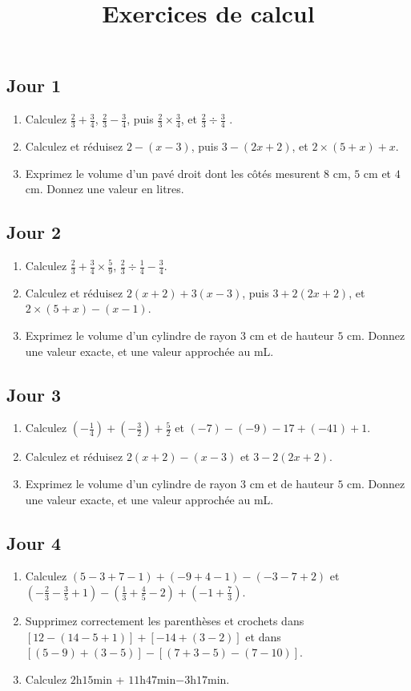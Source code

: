 \documentclass[14 pt, fleqn]{extarticle}
\title{Exercices de calcul}
\date{}
\theoremstyle{plain}
\begin{document}
	 
 \subsection*{Jour 1}
 
 \begin{enumerate}
 \item Calculez $\frac23+ \frac34$, $\frac23 - \frac34$, puis $\frac23\times\frac34$, et $\frac23\div \frac34$ .
 \item Calculez et réduisez $2 - (x-3)$, puis $3- (2x + 2)$, et $2\times (5+x)+ x$.
 \item Exprimez le volume d'un pavé droit dont les côtés mesurent $8$ cm, $5$ cm et $4$ cm. Donnez une valeur en litres. 
 \end{enumerate}
 \subsection*{Jour 2}
 
 \begin{enumerate}
 \item Calculez $\frac23+ \frac34\times \frac59$, $\frac23\div\frac14 - \frac34$.
 \item Calculez et réduisez $2(x+2) + 3(x-3)$, puis $3+ 2(2x + 2)$, et $2\times (5+x) - (x-1)$.
 \item Exprimez le volume d'un cylindre de rayon $3$ cm et de hauteur $5$ cm. Donnez une valeur exacte, et une valeur approchée au mL.
 \end{enumerate}
 
 \subsection*{Jour 3}
 
 \begin{enumerate}
 \item Calculez $(-\frac14) + (-\frac32) + \frac52$ et $(-7) - (-9) - 17 + (-41) + 1$.
 \item Calculez et réduisez $2(x+2) - (x-3)$ et $3- 2(2x + 2)$.
 \item Exprimez le volume d'un cylindre de rayon $3$ cm et de hauteur $5$ cm. Donnez une valeur exacte, et une valeur approchée au mL.
 \end{enumerate}
 \subsection*{Jour 4}
 
 \begin{enumerate}
 \item Calculez $(5-3+7-1) + (-9+4-1) - (-3-7+2)$ et $\left( -\frac23 - \frac35 + 1\right) - \left(\frac13+\frac45 - 2\right) + \left (-1+ \frac73\right)$.
 \item Supprimez correctement les parenthèses et crochets dans $[12-(14 - 5 + 1) ] + [-14 + (3-2)]$ et dans $[(5-9)+(3-5)] - [(7+3-5)-(7-10)]$. 
 \item Calculez $2$h$15$min + $11$h$47$min$-3$h$17$min.
 \end{enumerate}
 
\end{document}
